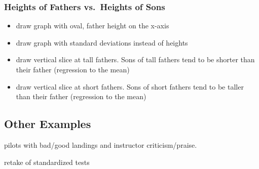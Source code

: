 \documentclass[letterpaper, landscape]{exam}
\begin{document}
  \subsubsection{Heights of Fathers vs.\ Heights of Sons} %

  \begin{itemize}
    \item draw graph with oval, father height on the x-axis
    \item draw graph with standard deviations instead of heights
    \item draw vertical slice at tall fathers. Sons of tall fathers tend to be
      shorter than their father (regression to the mean)
    \item draw vertical slice at short fathers. Sons of short fathers tend to be
      taller than their father (regression to the mean)
  \end{itemize}
  
  \subsection{Other Examples} %
  
  \begin{itemize*}
    \item pilots with bad/good landings and instructor criticism/praise.
    \item retake of standardized tests
  \end{itemize*}
\end{document}
